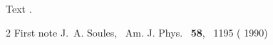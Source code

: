 \documentclass[aps,pre]{revtex4-1}
\begin{document}
Text \cite{Note1,Soules}.
\begin{thebibliography}{2}
%
  \BibitemOpen
   {First note}%
%
  \BibitemOpen
   { {J.~A. Soules}},\  {Am. J. Phys.}\ \textbf { {58}},\  {1195} ( {1990})%
\end{thebibliography}
\end{document}
